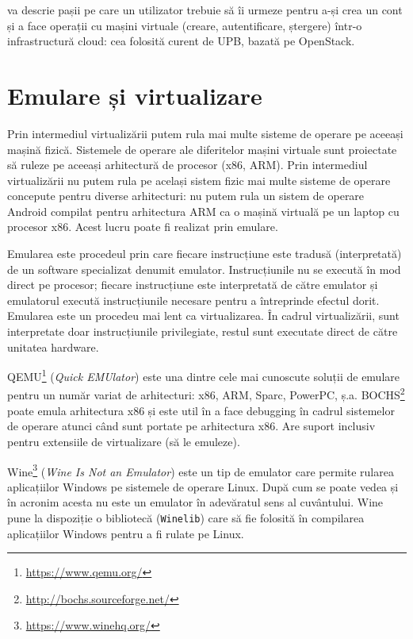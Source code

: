  va descrie pașii pe care un utilizator trebuie să îi
urmeze pentru a-și crea un cont și a face operații cu mașini virtuale (creare,
autentificare, ștergere) într-o infrastructură cloud: cea folosită curent de UPB, bazată pe OpenStack.

\section{Emulare și virtualizare}
\label{sec:vm:emulation}

Prin intermediul virtualizării putem rula mai multe sisteme de operare pe
aceeași mașină fizică. Sistemele de operare ale diferitelor mașini virtuale sunt proiectate să ruleze pe aceeași
arhitectură de procesor (x86, ARM). Prin intermediul virtualizării nu putem rula pe
același sistem fizic mai multe sisteme de operare concepute pentru diverse
arhitecturi: nu putem rula un sistem de operare Android compilat pentru
arhitectura ARM ca o mașină virtuală pe un laptop cu procesor x86. Acest lucru
poate fi realizat prin emulare.

Emularea este procedeul prin care fiecare
instrucțiune este tradusă (interpretată) de un software specializat denumit
emulator. Instrucțiunile nu se execută în mod direct pe procesor; fiecare
instrucțiune este interpretată de către emulator și emulatorul execută
instrucțiunile necesare pentru a întreprinde efectul dorit. Emularea este un
procedeu mai lent ca virtualizarea. În cadrul virtualizării, sunt
interpretate doar instrucțiunile privilegiate, restul sunt executate direct de
către unitatea hardware.

QEMU\footnote{\url{https://www.qemu.org/}}  (\textit{Quick EMUlator}) este una dintre cele mai cunoscute soluții de emulare pentru un număr variat de arhitecturi: x86, ARM, Sparc, PowerPC, ș.a.
BOCHS\footnote{\url{http://bochs.sourceforge.net/}} poate emula arhitectura x86 și este util în a face debugging în cadrul sistemelor de operare atunci când sunt portate pe arhitectura x86.
Are suport inclusiv pentru extensiile de virtualizare (să le emuleze).

Wine\footnote{\url{https://www.winehq.org/}} (\textit{Wine Is Not an Emulator}) este un tip de emulator care
permite rularea aplicațiilor Windows pe sistemele de operare Linux. După cum se
poate vedea și în acronim acesta nu este un emulator în adevăratul sens al
cuvântului. Wine pune la dispoziție o bibliotecă
(\texttt{Winelib}) care să fie folosită în compilarea aplicațiilor Windows pentru a fi
rulate pe Linux.

